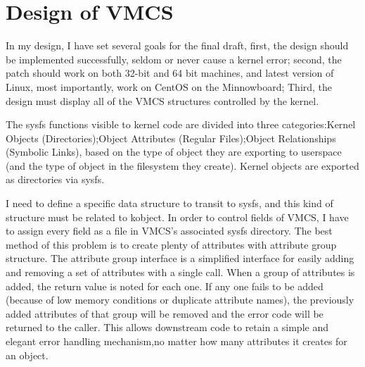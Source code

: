 \documentclass[10pt,draftclsnofoot,peerreview,letterpaper,onecolumn,]{IEEEtran}
\begin{document}
\section{Design of VMCS}
In my design, I have set several goals for the final draft, first, the design should be implemented successfully, seldom or never cause a kernel error; second, the patch should work on both 32-bit and 64 bit machines, and latest version of Linux, most importantly, work on CentOS on the Minnowboard; Third, the design must display all of the VMCS structures controlled by the kernel.

The sysfs functions visible to kernel code are divided into three categories:Kernel Objects (Directories);Object Attributes (Regular Files);Object Relationships (Symbolic Links), based on the type of object they are exporting to userspace (and the type of object in the filesystem they create). Kernel objects are exported as directories via sysfs.

I need to define a specific data structure to transit to sysfs, and this kind of structure must be related to kobject. In order to control fields of VMCS, I have to assign every field as a file in VMCS’s associated sysfs directory. The best method of this problem is to create plenty of attributes with attribute group structure. The attribute group interface is a simplified interface for easily adding and removing a set of attributes with a single call. When a group of attributes is added, the return value is noted for each one. If any one fails to be added (because of low memory conditions or duplicate attribute names), the previously added attributes of that group will be removed and the error code will be returned to the caller. This  allows downstream code to retain a simple and elegant error handling mechanism,no matter how many attributes it creates for an object.
\end{document}

